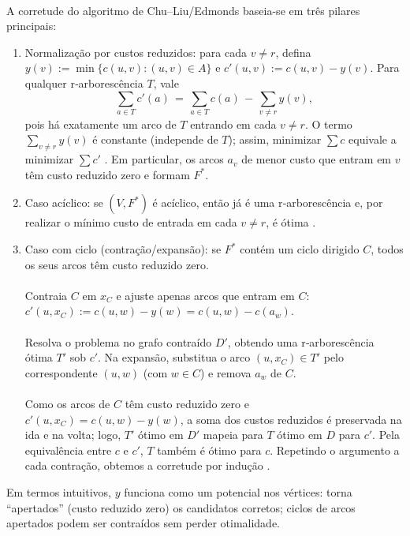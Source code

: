 \documentclass[12pt,a4paper]{article}
\def\emph#1{#1}%
\begin{document}
\paragraph{}
A corretude do algoritmo de Chu–Liu/Edmonds baseia-se em três pilares principais:
\begin{enumerate}\setlength{\itemsep}{2pt}
    \item \emph{Normalização por custos reduzidos:} para cada \(v\neq r\), defina \(y(v):=\min\{c(u,v):(u,v)\in A\}\) e \(c'(u,v):=c(u,v)-y(v)\). Para qualquer r‑arborescência \(T\), vale
    \[
        \sum_{a\in T} c'(a) \,=\, \sum_{a\in T} c(a) \, - \, \sum_{v\neq r} y(v),
    \]
    pois há exatamente um arco de \(T\) entrando em cada \(v\neq r\). O termo \(\sum_{v\neq r} y(v)\) é constante (independe de \(T\)); assim, minimizar \(\sum c\) equivale a minimizar \(\sum c'\) \cite[Obs.~4.37]{kleinberg2006}. Em particular, os arcos \(a_v\) de menor custo que entram em \(v\) têm custo reduzido zero e formam \(F^*\).
    \item \emph{Caso acíclico:} se \((V,F^*)\) é acíclico, então já é uma r‑arborescência e, por realizar o mínimo custo de entrada em cada \(v\neq r\), é ótima \cite[Obs.~4.36]{kleinberg2006}.
    \item \emph{Caso com ciclo (contração/expansão):} se \(F^*\) contém um ciclo dirigido \(C\), todos os seus arcos têm custo reduzido zero. 
    \paragraph{}
    Contraia \(C\) em \(x_C\) e ajuste apenas arcos que \emph{entram} em \(C\): \(c'(u,x_C):=c(u,w)-y(w)=c(u,w)-c(a_w)\). 
    \paragraph{}
    Resolva o problema no grafo contraído \(D'\), obtendo uma r‑arborescência ótima \(T'\) sob \(c'\). Na expansão, substitua o arco \((u,x_C)\in T'\) pelo correspondente \((u,w)\) (com \(w\in C\)) e remova \(a_w\) de \(C\). 
    \paragraph{}
    Como os arcos de \(C\) têm custo reduzido zero e \(c'(u,x_C)=c(u,w)-y(w)\), a soma dos custos reduzidos é preservada na ida e na volta; logo, \(T'\) ótimo em \(D'\) mapeia para \(T\) ótimo em \(D\) para \(c'\). Pela equivalência entre \(c\) e \(c'\), \(T\) também é ótimo para \(c\). Repetindo o argumento a cada contração, obtemos a corretude por indução \cite[Sec.~4.9]{kleinberg2006,schrijver2003comb}.
\end{enumerate}
Em termos intuitivos, \(y\) funciona como um potencial nos vértices: torna “apertados” (custo reduzido zero) os candidatos corretos; ciclos de arcos apertados podem ser contraídos sem perder otimalidade.
\end{document}
